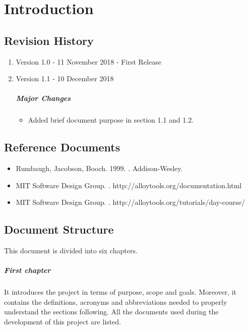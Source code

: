 \documentclass[../rasd.tex]{subfiles}
\begin{document}
\chapter{Introduction}
\thispagestyle{fancy}
		
		
		
		
		
	
		\section{Revision History}
		\begin{enumerate}
			\item Version 1.0 - 11 November 2018 - First Release
			\item Version 1.1 - 10 December 2018
				\paragraph{Major Changes}
				\begin{itemize}
					\item Added brief document purpose in section 1.1 and 1.2.
				\end{itemize}

		\end{enumerate}
		\section{Reference Documents}
			\begin{itemize}
				\item Rumbaugh, Jacobson, Booch. 1999. . Addison-Wesley.
				\item MIT Software Design Group. . http://alloytools.org/documentation.html
				\item MIT Software Design Group. . http://alloytools.org/tutorials/day-course/
			\end{itemize}
		\section{Document Structure}
		This document is divided into six chapters.
		\paragraph{First chapter}
		It introduces the project in terms of purpose, scope and goals. Moreover, it contains the definitions, acronyms and abbreviations needed to properly understand the sections following. All the documents used during the development of this project are listed.
\end{document}

